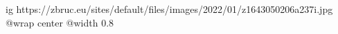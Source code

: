  
 
 
 
 

\ifcmt
  ig https://zbruc.eu/sites/default/files/images/2022/01/z1643050206a237i.jpg
	@wrap center
	@width 0.8
\fi
